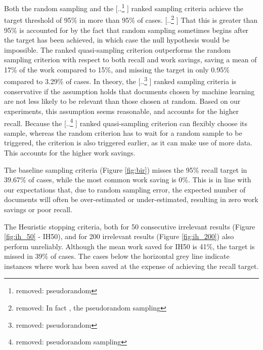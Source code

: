\documentclass{bmcart}
\providecommand{\DIFadd}[1]{{\protect\color{blue} \sf #1}} %
\providecommand{\DIFdel}[1]{{\protect\color{red} [..\footnote{removed: #1} ]}} %
\providecommand{\DIFaddbegin}{} %
\providecommand{\DIFaddend}{} %
\providecommand{\DIFdelbegin}{} %
\providecommand{\DIFdelend}{} %
\newcommand{\DIFscaledelfig}{0.5}
\newlength{\DIFdelgraphicswidth} %
\newlength{\DIFdelgraphicsheight} %
\newcommand{\DIFaddincludegraphics}[2][]{{\color{blue}\fbox{\DIFOincludegraphics[#1]{#2}}}} %
\newcommand{\DIFdelincludegraphics}[2][]{%
\sbox{\DIFdelgraphicsbox}{\DIFOincludegraphics[#1]{#2}}%
\settoboxwidth{\DIFdelgraphicswidth}{\DIFdelgraphicsbox} %
\settoboxtotalheight{\DIFdelgraphicsheight}{\DIFdelgraphicsbox} %
\scalebox{\DIFscaledelfig}{%
\parbox[b]{\DIFdelgraphicswidth}{\usebox{\DIFdelgraphicsbox}\\[-\baselineskip] \rule{\DIFdelgraphicswidth}{0em}}\llap{\resizebox{\DIFdelgraphicswidth}{\DIFdelgraphicsheight}{%
\setlength{\unitlength}{\DIFdelgraphicswidth}%
\begin{picture}(1,1)%
\thicklines\linethickness{2pt} %
{\color[rgb]{1,0,0}\put(0,0){\framebox(1,1){}}}%
{\color[rgb]{1,0,0}\put(0,0){\line( 1,1){1}}}%
{\color[rgb]{1,0,0}\put(0,1){\line(1,-1){1}}}%
\end{picture}%
}\hspace*{3pt}}} %
} %
\DeclareRobustCommand{\DIFaddbegin}{\DIFOaddbegin \let\includegraphics\DIFaddincludegraphics} %
\DeclareRobustCommand{\DIFaddend}{\DIFOaddend \let\includegraphics\DIFOincludegraphics} %
\DeclareRobustCommand{\DIFdelbegin}{\DIFOdelbegin \let\includegraphics\DIFdelincludegraphics} %
\DeclareRobustCommand{\DIFdelend}{\DIFOaddend \let\includegraphics\DIFOincludegraphics} %
\begin{document}
	Both the random sampling and the \DIFdelbegin \DIFdel{pseudorandom }\DIFdelend \DIFaddbegin \DIFadd{ranked }\DIFaddend sampling criteria achieve the target threshold of 95\% in more than 95\% of cases. 
	\DIFdelbegin \DIFdel{In fact , the pseudorandom sampling }\DIFdelend \DIFaddbegin \DIFadd{That this is greater than 95\% is accounted for by the fact that random sampling sometimes begins after the target has been achieved, in which case the null hypothesis would be \text{a priori} impossible.
	The ranked quasi-sampling }\DIFaddend criterion  outperforms the random sampling criterion with respect to both recall and work savings, saving a mean of 17\% of the work compared to 15\%, and missing the target in only 0.95\% compared to 3.29\% of cases. In theory, the \DIFdelbegin \DIFdel{pseudorandom }\DIFdelend \DIFaddbegin \DIFadd{ranked }\DIFaddend sampling criteria is conservative if the assumption holds that documents chosen by machine learning are not less likely to be relevant than those chosen at random. Based on our experiments, this assumption seems reasonable, and accounts for the higher recall. Because the \DIFdelbegin \DIFdel{pseudorandom sampling }\DIFdelend \DIFaddbegin \DIFadd{ranked quasi-sampling }\DIFaddend criterion can flexibly choose its sample, whereas the random criterion has to wait for a random sample to be triggered, the criterion is also triggered earlier, as it can make use of more data. This accounts for the higher work savings.

	
	
	The baseline sampling criteria (Figure \ref{fig:bir}) misses the 95\% recall target in 39.67\% of cases, while the most common work saving is 0\%. This is in line with our expectations that, due to random sampling error, the expected number of documents will often be over-estimated or under-estimated, resulting in zero work savings or poor recall.

	The Heuristic stopping criteria, both for 50 consecutive irrelevant results (Figure \ref{fig:ih_50} - IH50), and for 200 irrelevant results (Figure \ref{fig:ih_200}) also perform unreliably. Although the mean work saved for IH50 is 41\%, the target is missed in 39\% of cases. The cases below the horizontal grey line indicate instances where work has been saved at the expense of achieving the recall target.
\end{document}
